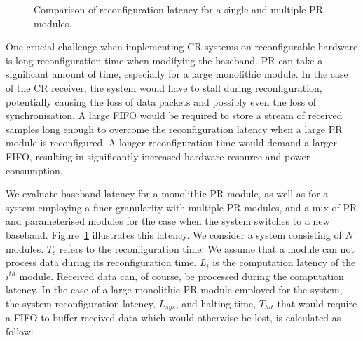 \begin{figure}
\caption{Comparison of reconfiguration latency for a single and multiple PR modules.}
\label{fig:timing}
\end{figure}

One crucial challenge when implementing CR systems on reconfigurable hardware is long reconfiguration time when modifying the baseband.
PR can take a significant amount of time, especially for a large monolithic module.
In the case of the CR receiver, the system would have to stall during reconfiguration, potentially causing the loss of data packets and possibly even the loss of synchronisation.
A large FIFO would be required to store a stream of received samples long enough to overcome the reconfiguration latency when a large PR module is reconfigured.
A longer reconfiguration time would demand a larger FIFO, resulting in significantly increased hardware resource and power consumption.

We evaluate baseband latency for a monolithic PR module, as well as for a system employing a finer granularity with multiple PR modules, and a mix of PR and parameterised modules for the case when the system switches to a new baseband.
Figure~\ref{fig:timing} illustrates this latency. We consider a system consisting of $N$ modules. $T_{c}$ refers to the reconfiguration time.
We assume that a module can not process data during its reconfiguration time.
$L_{i}$ is the computation latency of the $i^{th}$ module. Received data can, of course, be processed during the computation latency. In the case of a large monolithic PR module employed for the system, the system reconfiguration latency, $L_{sys}$, and halting time, $T_{hlt}$ that would require a FIFO to buffer received data which would otherwise be lost, is calculated as follow:

